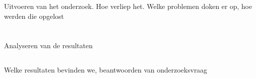 \section{}
\label{sec:fase-2}
Uitvoeren van het onderzoek. Hoe verliep het. Welke problemen doken er op, hoe werden die opgelost

\section{}
\label{sec:fase-3}
Analyseren van de resultaten

\subsection{}
\label{sec:analyseren-van-resultaten}
Welke resultaten bevinden we, beantwoorden van onderzoeksvraag